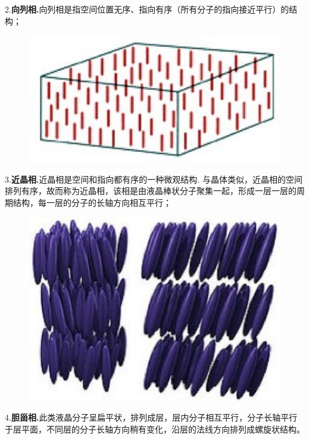 2.\textbf{向列相.}向列相是指空间位置无序、指向有序（所有分子的指向接近平行）的结构；\\
\begin{figure}[H]
	\centering   
	\includegraphics[width=12cm]{./figures/4.png}
\end{figure}
3.\textbf{近晶相.}近晶相是空间和指向都有序的一种微观结构. 与晶体类似，近晶相的空间排列有序，故而称为近晶相，该相是由液晶棒状分子聚集一起，形成一层一层的周期结构，每一层的分子的长轴方向相互平行；\\
\begin{figure}[H]
	\centering   
	\includegraphics[width=12cm]{./figures/3.png}
\end{figure}
4.\textbf{胆甾相.}此类液晶分子呈扁平状，排列成层，层内分子相互平行，分子长轴平行于层平面，不同层的分子长轴方向稍有变化，沿层的法线方向排列成螺旋状结构。\\
